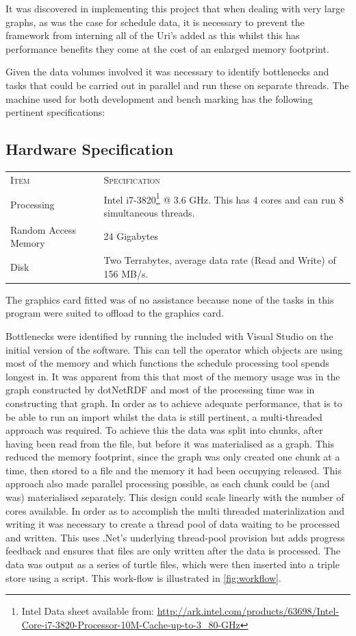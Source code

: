 It was discovered in implementing this project that when dealing with very large graphs, as was the case for schedule data, it is necessary to prevent the framework from interning all of the Uri's added as this whilst this has performance benefits they come at the cost of an enlarged memory footprint.

Given the data volumes involved it was necessary to identify bottlenecks and tasks that could be carried out in parallel and run these on separate threads. The machine used for both development and bench marking has the following pertinent specifications:
\subsection{Hardware Specification}

\noindent
\begin{tabularx}{\textwidth}{XX} 
\textsc{Item} & \textsc{Specification}\\ 
\arrayrulecolor{LightSteelBlue}\midrule[\heavyrulewidth]
Processing & Intel i7-3820\footnote{Intel Data sheet available from: \url{http://ark.intel.com/products/63698/Intel-Core-i7-3820-Processor-10M-Cache-up-to-3_80-GHz}} @ 3.6 GHz. This has 4 cores and can run 8 simultaneous threads. \\
Random Access Memory & 24 Gigabytes \\
Disk & Two Terrabytes, average data rate (Read and Write) of 156 MB/s. \\
\bottomrule
\end{tabularx}
 
The graphics card fitted was of no assistance because none of the tasks in this program were suited to offload to the graphics card.

Bottlenecks were identified by running the  included with Visual Studio on the initial version of the software. This can tell the operator which objects are using most of the memory and which functions the schedule processing tool spends longest in. It was apparent from this that most of the memory usage was in the graph constructed by dotNetRDF and most of the processing time was in constructing that graph. In order as to achieve adequate performance, that is to be able to run an import whilst the data is still pertinent, a multi-threaded approach was required. To achieve this the data was split into chunks, after having been read from the file, but before it was materialised as a graph. This reduced the memory footprint, since the graph was only created one chunk at a time, then stored to a file and the memory it had been occupying released. This approach also made parallel processing possible, as each chunk could be (and was) materialised separately. This design could scale linearly with the number of cores available. In order as to accomplish the multi threaded materialization and writing it was necessary to create a thread pool of data waiting to be processed and written. This uses .Net's underlying thread-pool provision but adds progress feedback and ensures that files are only written after the data is processed. The data was output as a series of turtle files, which were then inserted into a triple store using a script. This work-flow is illustrated in \autoref{fig:workflow}.

